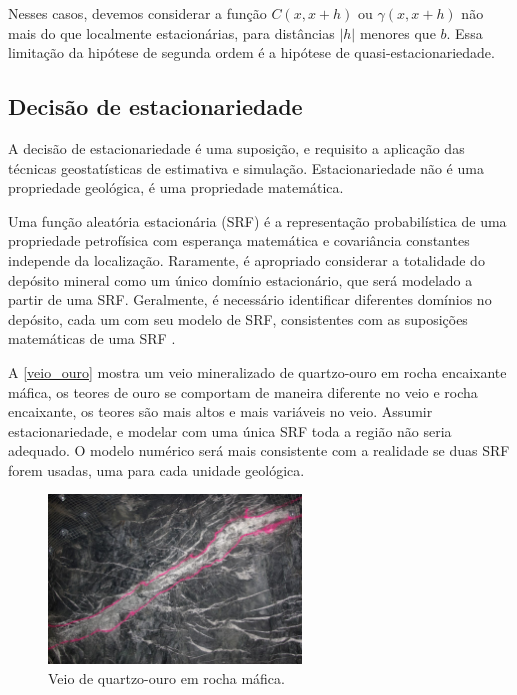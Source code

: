Nesses casos, devemos considerar a função $C(x,x+h)$ ou $\gamma(x,x+h)$ não mais do que localmente estacionárias, para distâncias $|h|$ menores que $b$. Essa limitação da hipótese de segunda ordem é a hipótese de quasi-estacionariedade.
							
\subsection{Decisão de estacionariedade}
				
A decisão de estacionariedade é uma suposição, e requisito a aplicação das técnicas geostatísticas de estimativa e simulação. Estacionariedade não é uma propriedade geológica, é uma propriedade matemática.
				
Uma função aleatória estacionária (SRF) é a representação probabilística de uma propriedade petrofísica com esperança matemática e covariância constantes independe da localização. Raramente, é apropriado considerar a totalidade do depósito mineral como um único domínio estacionário, que será modelado a partir de uma SRF. Geralmente, é necessário identificar diferentes domínios no depósito, cada um com seu modelo de SRF, consistentes com as suposições matemáticas de uma SRF \cite{mclennan}.
				
A \autoref{veio_ouro} mostra um veio mineralizado de quartzo-ouro em rocha encaixante máfica, os teores de ouro se comportam de maneira diferente no veio e rocha encaixante, os teores são mais altos e mais variáveis no veio. Assumir estacionariedade, e modelar com uma única SRF toda a região não seria adequado. O modelo numérico será mais consistente com a realidade se duas SRF forem usadas, uma para cada unidade geológica.
				
\begin{figure}[!htb]
	\caption{\label{veio_ouro}Veio de quartzo-ouro em rocha máfica.}
	\begin{center}
		\includegraphics[width=0.6\textwidth]{revisao_bibliografica/veio_ouro.jpg}
	\end{center}
\end{figure}
				

